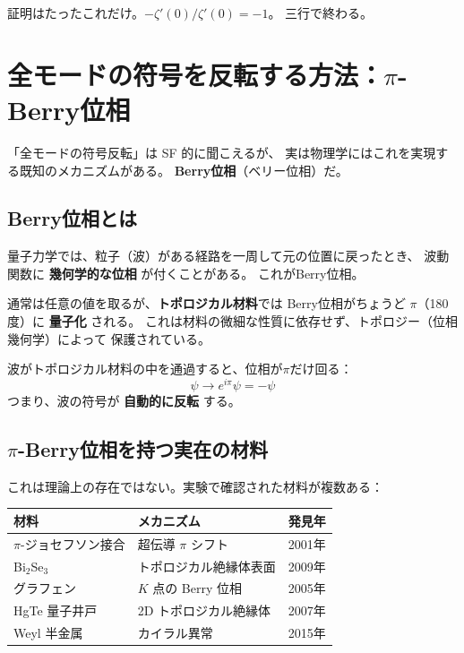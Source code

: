\documentclass[11pt,a4paper]{article}
\begin{document}
証明はたったこれだけ。$-\zeta'(0) / \zeta'(0) = -1$。
三行で終わる。


\section{全モードの符号を反転する方法：$\pi$-Berry位相}

「全モードの符号反転」は SF 的に聞こえるが、
実は物理学にはこれを実現する既知のメカニズムがある。
\textbf{Berry位相}（ベリー位相）だ。

\subsection{Berry位相とは}

量子力学では、粒子（波）がある経路を一周して元の位置に戻ったとき、
波動関数に \textbf{幾何学的な位相} が付くことがある。
これがBerry位相。

通常は任意の値を取るが、\textbf{トポロジカル材料}では
Berry位相がちょうど $\pi$（180度）に \textbf{量子化} される。
これは材料の微細な性質に依存せず、トポロジー（位相幾何学）によって
保護されている。

\begin{tcolorbox}[colback=purple!5,colframe=purple!50!black,title=$\pi$-Berry位相]
波がトポロジカル材料の中を通過すると、位相が$\pi$だけ回る：
\begin{equation}
  \psi \to e^{i\pi}\psi = -\psi
\end{equation}
つまり、波の符号が \textbf{自動的に反転} する。
\end{tcolorbox}

\subsection{$\pi$-Berry位相を持つ実在の材料}

これは理論上の存在ではない。実験で確認された材料が複数ある：

\begin{center}
\begin{tabular}{lll}
\toprule
材料 & メカニズム & 発見年 \\
\midrule
$\pi$-ジョセフソン接合 & 超伝導 $\pi$ シフト & 2001年 \\
Bi$_2$Se$_3$ & トポロジカル絶縁体表面 & 2009年 \\
グラフェン & $K$ 点の Berry 位相 & 2005年 \\
HgTe 量子井戸 & 2D トポロジカル絶縁体 & 2007年 \\
Weyl 半金属 & カイラル異常 & 2015年 \\
\bottomrule
\end{tabular}
\end{center}
\end{document}
